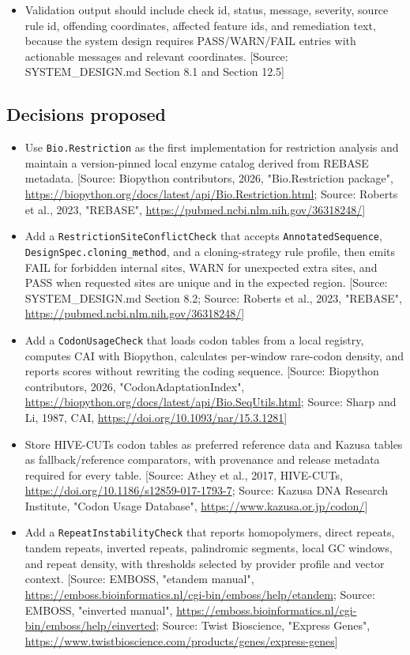 \documentclass[11pt]{report}
\begin{document}
\begin{itemize}
\item Validation output should include check id, status, message, severity, source rule id, offending coordinates, affected feature ids, and remediation text, because the system design requires PASS/WARN/FAIL entries with actionable messages and relevant coordinates. [Source: SYSTEM\_DESIGN.md Section 8.1 and Section 12.5]
\end{itemize}

\subsection{Decisions proposed}
\begin{itemize}
\item Use \texttt{Bio.Restriction} as the first implementation for restriction analysis and maintain a version-pinned local enzyme catalog derived from REBASE metadata. [Source: Biopython contributors, 2026, "Bio.Restriction package", \url{https://biopython.org/docs/latest/api/Bio.Restriction.html}; Source: Roberts et al., 2023, "REBASE", \url{https://pubmed.ncbi.nlm.nih.gov/36318248/}]
\item Add a \texttt{RestrictionSiteConflictCheck} that accepts \texttt{AnnotatedSequence}, \texttt{DesignSpec.cloning\_method}, and a cloning-strategy rule profile, then emits FAIL for forbidden internal sites, WARN for unexpected extra sites, and PASS when requested sites are unique and in the expected region. [Source: SYSTEM\_DESIGN.md Section 8.2; Source: Roberts et al., 2023, "REBASE", \url{https://pubmed.ncbi.nlm.nih.gov/36318248/}]
\item Add a \texttt{CodonUsageCheck} that loads codon tables from a local registry, computes CAI with Biopython, calculates per-window rare-codon density, and reports scores without rewriting the coding sequence. [Source: Biopython contributors, 2026, "CodonAdaptationIndex", \url{https://biopython.org/docs/latest/api/Bio.SeqUtils.html}; Source: Sharp and Li, 1987, CAI, \url{https://doi.org/10.1093/nar/15.3.1281}]
\item Store HIVE-CUTs codon tables as preferred reference data and Kazusa tables as fallback/reference comparators, with provenance and release metadata required for every table. [Source: Athey et al., 2017, HIVE-CUTs, \url{https://doi.org/10.1186/s12859-017-1793-7}; Source: Kazusa DNA Research Institute, "Codon Usage Database", \url{https://www.kazusa.or.jp/codon/}]
\item Add a \texttt{RepeatInstabilityCheck} that reports homopolymers, direct repeats, tandem repeats, inverted repeats, palindromic segments, local GC windows, and repeat density, with thresholds selected by provider profile and vector context. [Source: EMBOSS, "etandem manual", \url{https://emboss.bioinformatics.nl/cgi-bin/emboss/help/etandem}; Source: EMBOSS, "einverted manual", \url{https://emboss.bioinformatics.nl/cgi-bin/emboss/help/einverted}; Source: Twist Bioscience, "Express Genes", \url{https://www.twistbioscience.com/products/genes/express-genes}]

\end{itemize}
\end{document}
